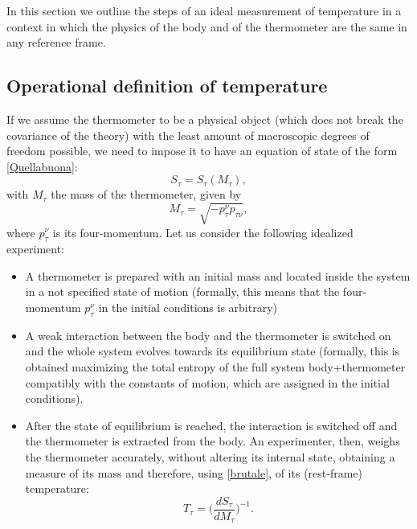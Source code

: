 \documentclass[twocolumn,usenatbib]{mnras2}
\begin{document}
In this section we outline the steps of an ideal measurement of temperature in a context in which the physics of the body and of the thermometer are the same in any reference frame.



\subsection{Operational definition of temperature}\label{operational}

If we assume the thermometer to be a physical object (which does not break the covariance of the theory) with the least amount of macroscopic degrees of freedom possible, we need to impose it to have an equation of state of the form \eqref{Quellabuona}:
\begin{equation}\label{brutale}
S_\tau =S_\tau (M_\tau), 
\end{equation}
with $M_\tau$ the mass of the thermometer, given by
\begin{equation}
M_\tau = \sqrt{-p_\tau^\nu p_{\tau \nu}},
\end{equation}
where $p_\tau^\nu$ is its four-momentum. Let us consider the following idealized experiment:
\begin{itemize}
\item A thermometer is prepared with an initial mass and located inside the system in a not specified state of motion (formally, this means that the four-momentum $p_\tau^\nu$ in the initial conditions is arbitrary)
\item A weak interaction between the body and the thermometer is switched on and the whole system evolves towards its equilibrium state (formally, this is obtained maximizing the total entropy of the full system body+thermometer compatibly with the constants of motion, which are assigned in the initial conditions).
\item After the state of equilibrium is reached, the interaction is switched off and the thermometer is extracted from the body. An experimenter, then, weighs the thermometer accurately, without altering its internal state, obtaining a measure of its mass and therefore, using \eqref{brutale}, of its (rest-frame) temperature: 
\begin{equation}
T_\tau = \bigg( \dfrac{dS_\tau}{dM_\tau} \bigg)^{-1}.
\end{equation} 
\end{itemize}
\end{document}
